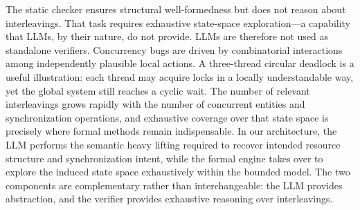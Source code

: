 The static checker ensures structural well-formedness but does not reason about interleavings. That task requires exhaustive state-space exploration—a capability that LLMs, by their nature, do not provide. LLMs are therefore not used as standalone verifiers. Concurrency bugs are driven by combinatorial interactions among independently plausible local actions. A three-thread circular deadlock is a useful illustration: each thread may acquire locks in a locally understandable way, yet the global system still reaches a cyclic wait. The number of relevant interleavings grows rapidly with the number of concurrent entities and synchronization operations, and exhaustive coverage over that state space is precisely where formal methods remain indispensable. In our architecture, the LLM performs the semantic heavy lifting required to recover intended resource structure and synchronization intent, while the formal engine takes over to explore the induced state space exhaustively within the bounded model. The two components are complementary rather than interchangeable: the LLM provides abstraction, and the verifier provides exhaustive reasoning over interleavings.

